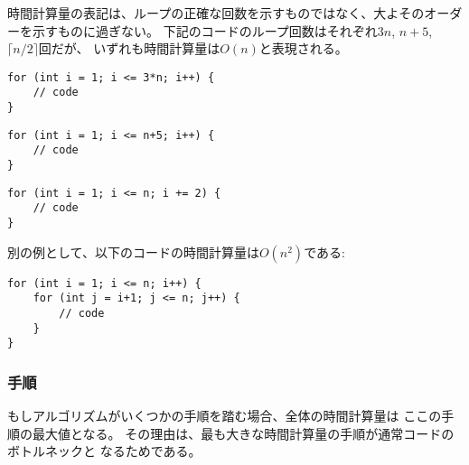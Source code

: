 時間計算量の表記は、ループの正確な回数を示すものではなく、大よそのオーダーを示すものに過ぎない。
下記のコードのループ回数はそれぞれ$3n$, $n+5$, $\lceil n/2 \rceil$回だが、
いずれも時間計算量は$O(n)$と表現される。

\begin{lstlisting}
for (int i = 1; i <= 3*n; i++) {
    // code
}
\end{lstlisting}

\begin{lstlisting}
for (int i = 1; i <= n+5; i++) {
    // code
}
\end{lstlisting}

\begin{lstlisting}
for (int i = 1; i <= n; i += 2) {
    // code
}
\end{lstlisting}

\begin{comment}
As another example,
the time complexity of the following code is $O(n^2)$:
\end{comment}

別の例として、以下のコードの時間計算量は$O(n^2)$である:

\begin{lstlisting}
for (int i = 1; i <= n; i++) {
    for (int j = i+1; j <= n; j++) {
        // code
    }
}
\end{lstlisting}

\begin{comment}
\subsubsection*{Phases}

If the algorithm consists of consecutive phases,
the total time complexity is the largest
time complexity of a single phase.
The reason for this is that the slowest
phase is usually the bottleneck of the code.

For example, the following code consists
of three phases with time complexities
$O(n)$, $O(n^2)$ and $O(n)$.
Thus, the total time complexity is $O(n^2)$.
\end{comment}

\subsubsection*{手順}

もしアルゴリズムがいくつかの手順を踏む場合、全体の時間計算量は
ここの手順の最大値となる。
その理由は、最も大きな時間計算量の手順が通常コードのボトルネックと
なるためである。


